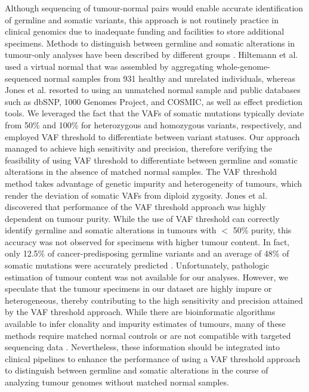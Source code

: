 Although sequencing of tumour-normal pairs would enable accurate identification of germline and somatic variants, this approach is not routinely practice in clinical genomics due to inadequate funding and facilities to store additional specimens. Methods to distinguish between germline and somatic alterations in tumour-only analyses have been described by different groups \cite{Hiltemann2015, Jones2015a, Garofalo2016}. Hiltemann et al. \cite{Hiltemann2015} used a virtual normal that was assembled by aggregating whole-genome-sequenced normal samples from 931 healthy and unrelated individuals, whereas Jones et al. \cite{Jones2015a} resorted to using an unmatched normal sample and public databases such as dbSNP, 1000 Genomes Project, and COSMIC, as well as effect prediction tools. We leveraged the fact that the VAFs of somatic mutations typically deviate from 50\% and 100\% for heterozygous and homozygous variants, respectively, and employed VAF threshold to differentiate between variant statuses. Our approach managed to achieve high sensitivity and precision, therefore verifying the feasibility of using VAF threshold to differentiate between germline and somatic alterations in the absence of matched normal samples. The VAF threshold method takes advantage of genetic impurity and heterogeneity of tumours, which render the deviation of somatic VAFs from diploid zygosity. Jones et al. \cite{Jones2015a} discovered that performance of the VAF threshold approach was highly dependent on tumour purity. While the use of VAF threshold can correctly identify germline and somatic alterations in tumours with $<$ 50\% purity, this accuracy was not observed for specimens with higher tumour content. In fact, only 12.5\% of cancer-predisposing germline variants and an average of 48\% of somatic mutations were accurately predicted \cite{Jones2015a}. Unfortunately, pathologic estimation of tumour content was not available for our analyses. However, we speculate that the tumour specimens in our dataset are highly impure or heterogeneous, thereby contributing to the high sensitivity and precision attained by the VAF threshold approach. While there are bioinformatic algorithms available to infer clonality and impurity estimates of tumours, many of these methods require matched normal controls or are not compatible with targeted sequencing data \cite{Yadav2015}. Nevertheless, these information should be integrated into clinical pipelines to enhance the performance of using a VAF threshold approach to distinguish between germline and somatic alterations in the course of analyzing tumour genomes without matched normal samples.

